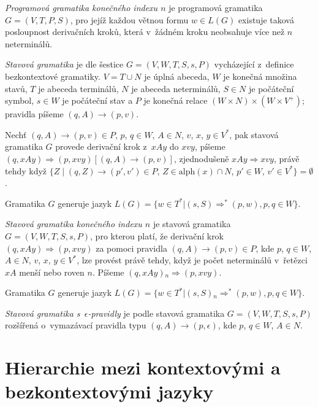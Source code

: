 \begin{Def}
\emph{Programová gramatika konečného indexu $n$} \cite{Krivka:RewritingSystems} je programová gramatika $G = (V,T,P,S)$, pro jejíž každou větnou formu $w \in L(G)$ existuje taková posloupnost derivačních kroků, která v~žádném kroku neobsahuje více než $n$ neterminálů.
\end{Def}

\begin{Def}
\emph{Stavová gramatika} je dle \cite{Kasai} šestice $G=(V,W,T,S,s,P)$ vycházející z~definice bezkontextové gramatiky. $V = T \cup N$ je úplná abeceda, $W$ je konečná množina stavů, $T$ je abeceda terminálů, $N$ je abeceda neterminálů, $S \in N$ je počáteční symbol, $s \in W$ je počáteční stav a $P$ je konečná relace $(W \times N) \times (W \times V^+)$; pravidla píšeme $(q,A) \rightarrow (p,v)$.

Nechť $(q,A) \rightarrow (p,v) \in P$, $p$, $q \in W$, $A \in N$, $v$, $x$, $y \in V^*$, pak stavová gramatika $G$ provede derivační krok z~$xAy$ do $xvy$, píšeme $(q, xAy) \Rightarrow (p, xvy) [(q,A) \rightarrow (p,v)]$, zjednodušeně $xAy \Rightarrow xvy$, právě tehdy když $\{Z \mid (q,Z) \rightarrow (p',v') \in P$, $Z \in \mathrm{alph}(x) \cap N$, $p' \in W$, $v' \in V^* \} = \emptyset$. 

Gramatika $G$ generuje jazyk $L(G) = \{w \in T^* | (s, S) {\Rightarrow}^* (p, w), p,q \in W \}$.


\end{Def}

\begin{Def}
\emph{Stavová gramatika konečného indexu $n$} je stavová gramatika $G=(V,W,T,S,s,P)$, pro kterou platí, že derivační krok $(q, xAy) \Rightarrow (p, xvy)$ za pomoci pravidla $(q,A) \rightarrow (p,v) \in P$, kde $p$, $q \in W$, $A \in N$, $v$, $x$, $y \in V^*$, lze provést právě tehdy, když je počet neterminálů v~řetězci $xA$ menší nebo roven $n$. Píšeme $(q, xAy) {}_n\Rightarrow (p, xvy)$. 

Gramatika $G$ generuje jazyk $L(G) = \{w \in T^* | (s, S) {}_n{\Rightarrow}^* (p, w), p,q \in W \}$.

\end{Def}

\begin{Def}
\emph{Stavová gramatika s~$\epsilon$-pravidly} je podle \cite{Meduna:StateGrammars} stavová gramatika $G=(V,W,T,S,s,P)$ rozšířená o~vymazávací pravidla typu $(q,A) \rightarrow (p,\epsilon)$, kde $p$, $q \in W$, $A \in N$.
\end{Def}


\section{Hierarchie mezi kontextovými a bezkontextovými jazyky}




